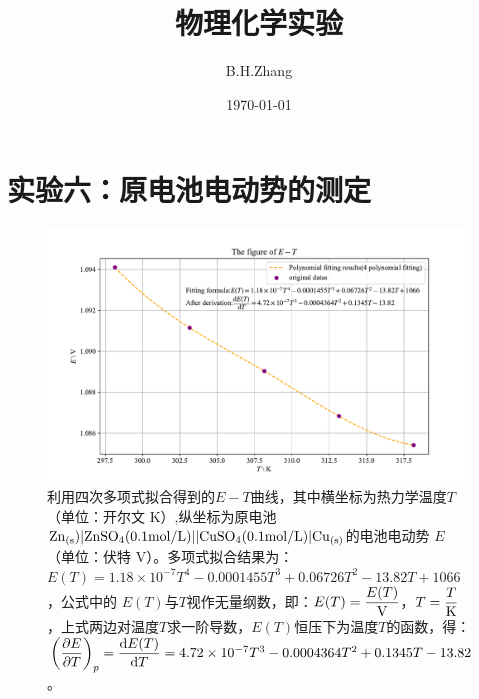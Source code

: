 \documentclass[UTF8,AutoFakeBold,a4paper]{article}
\title{\textbf{物理化学实验}}
\date{\today}
\author{B.H.Zhang}
\begin{document}
	\maketitle
	\section{实验六：原电池电动势的测定}
	\begin{figure}[h]
	\centering
	\includegraphics[scale=0.63]{6}
	\caption{利用四次多项式拟合得到的$E-T$曲线，其中横坐标为热力学温度$T$（单位：开尔文 K）,纵坐标为原电池$\ce{Zn}_{(\rm{s}})|\ce{ZnSO4}(0.1\rm{mol}/L)||\ce{CuSO4}(0.1\rm{mol/L})|\ce{Cu}_{(\rm{s})}$的电池电动势 $E$（单位：伏特 V）。多项式拟合结果为：\textcolor[rgb]{0.54,0.13,0.33}{$E(T) =1.18\times 10^{-7} T^{4} - 0.0001455 T^{3} + 0.06726 T^{2} - 13.82 T + 1066$}，公式中的 $E(T)$与$T$视作无量纲数，即：$E(T) = \dfrac{E(T)}{\ce{V}}$，$T = \dfrac{T}{\ce{K}}$，上式两边对温度$T$求一阶导数，$E(T)$恒压下为温度$T$的函数，得：\textcolor[rgb]{0.54,0.13,0.33}{$\pqty{\dfrac{\partial E}{\partial T}}_{p} = \dfrac{{\rm{d}}E(T)}{{\rm{d}}T} = 4.72\times 10^{-7} T^{3} - 0.0004364 T^{2} + 0.1345 T - 13.82$}。}
	\label{fi1}
\end{figure}
\end{document}
